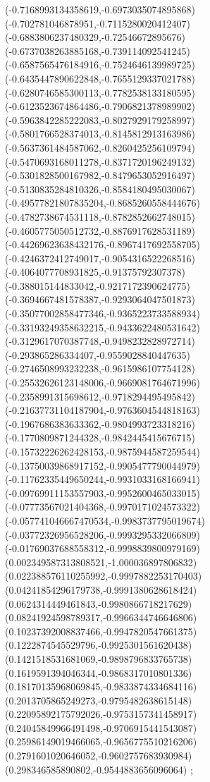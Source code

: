 {(-0.7168993134358619,-0.6973035074895868)
(-0.702781046878951,-0.7115280020412407)
(-0.6883806237480329,-0.72546672895676)
(-0.6737038263885168,-0.739114092541245)
(-0.6587565476184916,-0.7524646139989725)
(-0.6435447890622848,-0.7655129337021788)
(-0.6280746585300113,-0.7782538133180595)
(-0.6123523674864486,-0.7906821378989902)
(-0.5963842285222083,-0.8027929179258997)
(-0.5801766528374013,-0.8145812913163986)
(-0.5637361484587062,-0.8260425256109794)
(-0.5470693168011278,-0.8371720196249132)
(-0.5301828500167982,-0.8479653052916497)
(-0.5130835284810326,-0.8584180495030067)
(-0.49577821807835204,-0.8685260558444676)
(-0.4782738674531118,-0.8782852662748015)
(-0.4605775050512732,-0.8876917628531189)
(-0.44269623638432176,-0.8967417692558705)
(-0.4246372412749017,-0.9054316522268516)
(-0.4064077708931825,-0.91375792307378)
(-0.388015144833042,-0.9217172390624775)
(-0.3694667481578387,-0.9293064047501873)
(-0.35077002858477346,-0.9365223733588934)
(-0.33193249358632215,-0.9433622480531642)
(-0.3129617070387748,-0.9498232828972714)
(-0.293865286334407,-0.9559028840447635)
(-0.2746508993232238,-0.9615986107754128)
(-0.25532626123148006,-0.9669081764671996)
(-0.2358991315698612,-0.9718294495495842)
(-0.21637731104187904,-0.9763604544818163)
(-0.1967686383633362,-0.9804993723318216)
(-0.1770809871244328,-0.9842445415676715)
(-0.15732226262428153,-0.9875944587259544)
(-0.13750039868917152,-0.9905477790044979)
(-0.11762335449650244,-0.9931033168166941)
(-0.09769911153557903,-0.9952600465033015)
(-0.07773567021404368,-0.9970171024573322)
(-0.057741046667470534,-0.9983737795019674)
(-0.03772326956528206,-0.9993295332066809)
(-0.01769037688558312,-0.9998839800979169)
(0.002349587313808521,-1.000036897806832)
(0.022388576110255992,-0.9997882253170403)
(0.04241854296179738,-0.9991380628618424)
(0.0624314449461843,-0.9980866718217629)
(0.08241924598789317,-0.9966344746646806)
(0.10237392008837466,-0.9947820547661375)
(0.1222874545529796,-0.9925301561620438)
(0.1421518531681069,-0.9898796833765738)
(0.1619591394046344,-0.9868317010801336)
(0.18170135968069845,-0.9833874334684116)
(0.2013705865249273,-0.9795482638615148)
(0.22095892175792026,-0.9753157341458917)
(0.24045849966491498,-0.9706915441543087)
(0.25986149019466065,-0.9656775510216206)
(0.2791601020646052,-0.9602757683930984)
(0.298346585890802,-0.9544883656096064)
};
